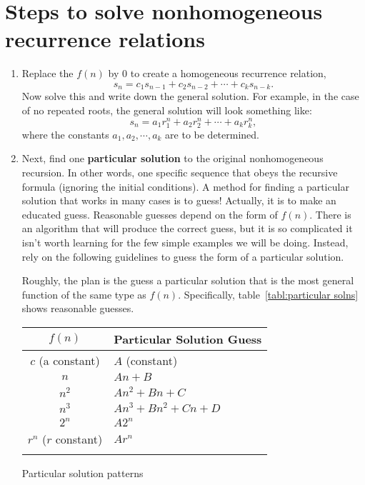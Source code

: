 \section{Steps to solve nonhomogeneous recurrence relations}
\begin{enumerate}[label=Step (\arabic*):]
 \item Replace the $f(n)$ by $0$ to create a
 homogeneous recurrence relation,
 $$s_n= c_1s_{n-1}+c_2s_{n-2}+\cdots+c_ks_{n-k}.$$
 Now solve this and write down the general solution. For example, in the case of no repeated roots,  
 the general solution will look something
 like:
 $$s_n=a_1r_1^n+a_2r_2^n+\cdots+a_kr_k^n,$$
 where the constants $a_1,a_2,\cdots,a_k$ are to be determined.
 
\clearpage
 \item Next, find one {\bfseries particular solution} to the
 original nonhomogeneous recursion.  In other words, one
 specific sequence that obeys the recursive formula (ignoring the 
 initial conditions).  A method for finding a particular
 solution that works in many cases is to guess! Actually, it is to make
 an educated guess. Reasonable guesses depend on the form of $f(n)$. 
 There is an algorithm that will produce the correct guess,
 but it is so complicated it isn't worth learning for the few simple
 examples we will be doing. Instead, rely on the following guidelines
 to guess the form of a  particular solution.
 
 Roughly, the plan is the guess a particular solution that is the most general
 function of the same type as $f(n)$. Specifically, table~\ref{tabl:particular solns}
 shows reasonable guesses.
 \begin{margintable}
 \centering
 \begin{tabular}{cl}
  \toprule
  $f(n)$ 
  & Particular Solution Guess \\
  \midrule
  $c$ (a constant)      & $A$ (constant) \\
  $n$                   & $An+B$ \\
  $n^2$                 & $An^2+Bn+C$ \\
  $n^3$                 & $An^3+Bn^2+Cn+D$ \\
  $2^n$                 & $A2^n$ \\
  $r^n$ ($r$ constant)  & $Ar^n$ \\
  \bottomrule\addlinespace
 \end{tabular}\caption{Particular solution patterns}\label{tabl:particular solns}
 \end{margintable}
 

\end{enumerate}
